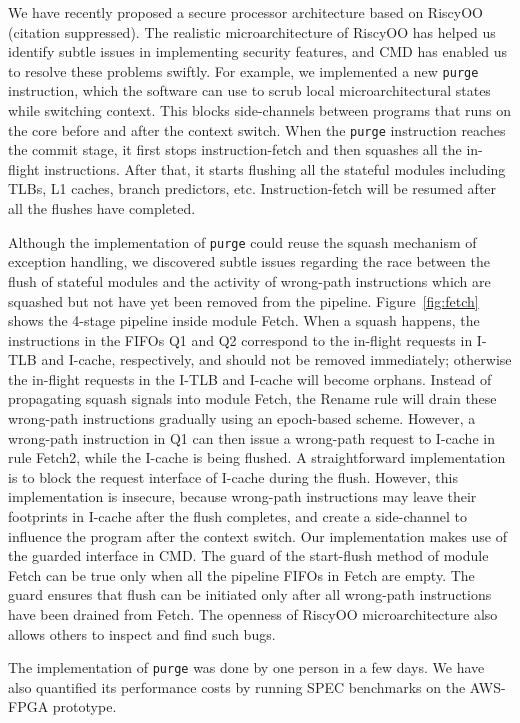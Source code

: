 \documentclass[conference]{IEEEtran}
\newcommand{\flushInst}{\texttt{purge}\xspace}
\begin{document}
We have recently proposed a secure processor architecture based on RiscyOO (citation suppressed).
The realistic microarchitecture of RiscyOO has helped us identify subtle issues in implementing security features, and CMD has enabled us to resolve these problems swiftly.
For example, we implemented a new \flushInst{} instruction, which the software can use to scrub local microarchitectural states while switching context. This blocks side-channels between programs that runs on the core before and after the context switch.
When the \flushInst{} instruction reaches the commit stage, it first stops instruction-fetch and then squashes all the in-flight instructions.
After that, it starts flushing all the stateful modules including TLBs, L1 caches, branch predictors, etc.
Instruction-fetch will be resumed after all the flushes have completed.

Although the implementation of \flushInst{} could reuse the squash mechanism of exception handling, we discovered subtle issues regarding the race between the flush of stateful modules and the activity of wrong-path instructions which are squashed but not have yet been removed from the pipeline.
Figure~\ref{fig:fetch} shows the 4-stage pipeline inside module Fetch.
When a squash happens, the instructions in the FIFOs Q1 and Q2 correspond to the in-flight requests in I-TLB and I-cache, respectively, and should not be removed immediately; otherwise the in-flight requests in the I-TLB and I-cache will become orphans.
Instead of propagating squash signals into module Fetch, the Rename rule will drain these wrong-path instructions gradually using an epoch-based scheme.
However, a wrong-path instruction in Q1 can then issue a wrong-path request to I-cache in rule Fetch2, while the I-cache is being flushed.
A straightforward implementation is to block the request interface of I-cache during the flush.
However, this implementation is insecure, because wrong-path instructions may leave their footprints in I-cache after the flush completes, and create a side-channel to influence the program after the context switch.
Our implementation makes use of the guarded interface in CMD.
The guard of the start-flush method of module Fetch can be true only when all the pipeline FIFOs in Fetch are empty.
The guard ensures that flush can be initiated only after all wrong-path instructions have been drained from Fetch.
The openness of RiscyOO microarchitecture also allows others to inspect and find such bugs.

The implementation of \flushInst{} was done by one person in a few days.
We have also quantified its performance costs by running SPEC benchmarks on the AWS-FPGA prototype.
\end{document}
